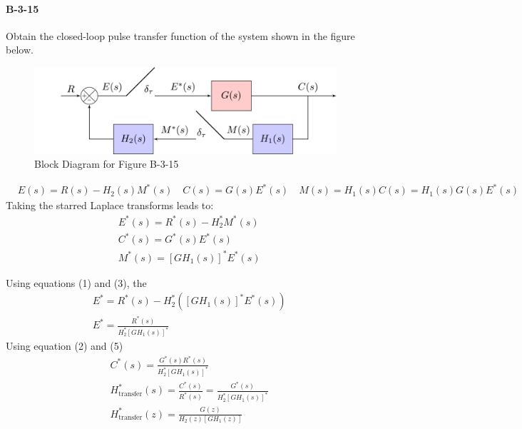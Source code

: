 \vspace*{1cm}
\paragraph{B-3-15}

Obtain the closed-loop pulse transfer function of the system shown in the figure below.
\begin{figure}[H]
	\centering
	\includegraphics [width=0.85\linewidth]{samplerTesting.png}
	\caption{Block Diagram for Figure B-3-15}
	\label{fig:OgataB-3-15}
\end{figure}
\vspace*{-1cm}
\begin{align*}
& E (s) = R(s)- H_2(s)M^\ast(s) \quad C(s)= G(s)E^\ast(s)  \quad M(s)=H_1(s)C(s)=H_1(s)G(s) E^\ast(s) 
\end{align*}
Taking the starred Laplace transforms leads to:
\begin{align}
& E^\ast(s)=R^\ast(s)-H_2^\ast M^\ast(s) \\
& C^\ast(s) = G^\ast(s)E^\ast(s) \\ 
& M^\ast(s)= [GH_1(s)]^\ast  E^\ast(s)
\end{align}

Using equations (1) and (3), the
\begin{align} 
& E^\ast = R^\ast(s)-H_2^\ast ([GH_1(s)]^\ast  E^\ast(s)) \\
& E^\ast = \frac{R^\ast(s)}{H_2^\ast [GH_1(s)]^\ast }
\end{align}
Using equation (2) and (5)
\begin{align*}
& C^\ast(s) =  \frac{G^\ast(s)R^\ast(s)}{H_2^\ast [GH_1(s)]^\ast }\\
& H_{\text{transfer}}^\ast(s)=\frac{C^\ast(s)}{R^\ast(s)} = \frac{G^\ast(s)}{H_2^\ast [GH_1(s)]^\ast } \\
& H_{\text{transfer}}^\ast(z)= \frac{G(z)}{H_2(z) [GH_1(z)]}
\end{align*}
